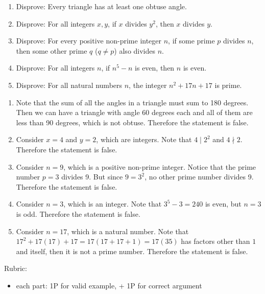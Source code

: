 \documentclass{article}
\theoremstyle{definition}
\begin{document}
\begin{question}
    \begin{enumerate}
        \item Disprove: Every triangle has at least one obtuse angle.
        \item Disprove: For all integers $x, y$, if $x$ divides $y^2$, then $x$ divides $y$.
        \item Disprove: For every positive non-prime integer $n$, if some prime $p$ divides $n$, 
            then some other prime $q$ ($q\neq p$) also divides $n$.
        \item Disprove: For all integers $n$, if $n^5-n$ is even, then $n$ is even.
        \item Disprove: For all natural numbers $n$, the integer $n^2+17n+17$ is prime.
    \end{enumerate}
\end{question}
\begin{solution}
\begin{enumerate}
\item Note that the sum of all the angles in a triangle must sum to 180 degrees. Then we can have a triangle with angle 60 degrees each and all of them are less than 90 degrees, which is not obtuse. Therefore the statement is false.

\item Consider $x=4$ and $y=2$, which are integers. Note that $4 \mid 2^2$ and $4 \nmid 2$. Therefore the statement is false.

\item Consider $n=9$, which is a positive non-prime integer. Notice that the prime number $p=3$ divides 9. But since $9=3^2$, no other prime number divides 9. Therefore the statement is false.

\item Consider $n=3$, which is an integer. Note that $3^5-3=240$ is even, but $n=3$ is odd. Therefore the statement is false.

\item Consider $n=17$, which is a natural number. Note that $17^2 + 17(17) + 17 = 17(17+17+1) = 17(35)$ has factors other than $1$ and itself, then it is not a prime number. Therefore the statement is false.
\end{enumerate}
{\color{red} Rubric:
\begin{itemize}
\item each part: 1P for valid example, + 1P for correct argument
\end{itemize}}
\end{solution}
\end{document}

